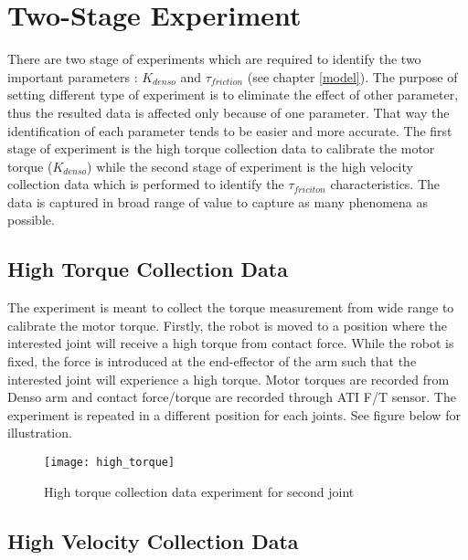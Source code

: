 \section{Two-Stage Experiment}
There are two stage of experiments which are required to identify the two important parameters : $K_{denso}$ and $\tau_{friction}$ (see chapter \ref{model}). The purpose of setting different type of experiment is to eliminate the effect of other parameter, thus the resulted data is affected only because of one parameter. That way the identification of each parameter tends to be easier and more accurate. The first stage of experiment is the high torque collection data to calibrate the motor torque ($K_{denso}$) while the second stage of experiment is the high velocity collection data which is performed to identify the $\tau_{friciton}$ characteristics. The data is captured in broad range of value to capture as many phenomena as possible.


\subsection{High Torque Collection Data}
\label{push exp}

The experiment is meant to collect the torque measurement from wide range to calibrate the motor torque. Firstly, the robot is moved to a position where the interested joint will receive a high torque from contact force. While the robot is fixed, the force is introduced at the end-effector of the arm such that the interested joint will experience a high torque. Motor torques are recorded from Denso arm and contact force/torque are recorded through ATI F/T sensor. The experiment is repeated in a different position for each joints. See figure below for illustration.

\begin{figure}[H]
    \centering
    \texttt{[image: high\_torque]}
    \caption{High torque collection data experiment for second joint}
\end{figure}


\subsection{High Velocity Collection Data}
\label{fric exp}

